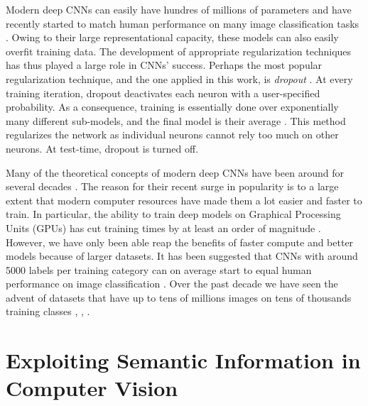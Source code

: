 \documentclass[12pt]{report}
\begin{document}
Modern deep CNNs can easily have hundres of millions of parameters and have recently started to match human performance on many image classification tasks \cite{Lecun2015}. Owing to their large representational capacity, these models can also easily overfit training data. The development of appropriate regularization techniques has thus played a large role in CNNs' success. Perhaps the most popular regularization technique, and the one applied in this work, is \textit{dropout} \cite{Srivastava2014}. At every training iteration, dropout deactivates each neuron with a user-specified probability. As a consequence, training is essentially done over exponentially many different sub-models, and the final model is their average \cite{Goodfellow2016}. This method regularizes the network as individual neurons cannot rely too much on other neurons. At test-time, dropout is turned off.

Many of the theoretical concepts of modern deep CNNs have been around for several decades \cite{JurgenSchmidhuber2015}. The reason for their recent surge in popularity is to a large extent that modern computer resources have made them a lot easier and faster to train. In particular, the ability to train deep models on Graphical Processing Units (GPUs) has cut training times by at least an order of magnitude \cite{Lecun2015}. However, we have only been able reap the benefits of faster compute and better models because of larger datasets. It has been suggested that CNNs with around 5000 labels per training category can on average start to equal human performance on image classification \cite{Goodfellow2016}. Over the past decade we have seen the advent of datasets that have up to tens of millions images on tens of thousands training classes \cite{Russakovsky2015i}, \cite{JiaDeng2009}, \cite{Netzer2011}.

\section{Exploiting Semantic Information in \\ Computer Vision}
\end{document}
